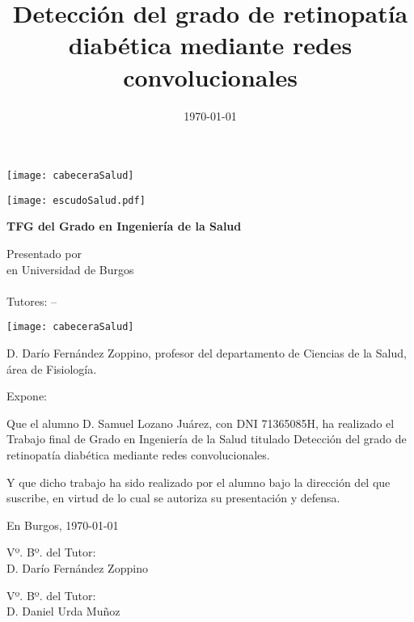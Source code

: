 \documentclass[a4paper,12pt,twoside]{memoir}
\title{Detección del grado de retinopatía diabética mediante redes convolucionales}
\author{\nombre}
\date{\today}
\makeatletter
\def\maketitle{
  \null
  \thispagestyle{empty}
\begin{center}
  \noindent\texttt{[image: cabeceraSalud]}\vspace{1.5cm}%
\end{center}
  
  \begin{center}
    \begin{minipage}[c][1.5cm][c]{.20\textwidth}
        \texttt{[image: escudoSalud.pdf]}
    \end{minipage}
  \end{center}
  
  \begin{center}
    \colorbox{cpardoBox}{%
        \begin{minipage}{.8\textwidth}
          \vspace{.5cm}\Large
          \begin{center}
          \textbf{TFG del Grado en Ingeniería de la Salud}\vspace{.6cm}\\
          \textbf{\LARGE\@title{}}
          \end{center}
          \vspace{.2cm}
        \end{minipage}
    }%
  \end{center}
  
  \begin{center}%
  {%
    \noindent\LARGE
    Presentado por \@author{}\\ 
    en Universidad de Burgos\\
    \vspace{0.5cm}
    \noindent\Large
    \@date{}\\
    \vspace{0.5cm}
    Tutores: \@tutor{} -- \@tutorb{}\\
  }%
  \end{center}%
  \null
  \cleardoublepage
  }
\newcommand{\nombre}{Samuel Lozano Juárez}
\newcommand{\nombreTutor}{Darío Fernández Zoppino}
\newcommand{\nombreTutorb}{Daniel Urda Muñoz}
\newcommand{\dni}{71365085H}
\makeatother
\begin{document}
\maketitle


\newpage\null\thispagestyle{empty}\newpage

\thispagestyle{empty}


\noindent\texttt{[image: cabeceraSalud]}\vspace{1cm}

\noindent D. \nombreTutor, profesor del departamento de Ciencias de la Salud, área de Fisiología.

\noindent Expone:

\noindent Que el alumno D. \nombre, con DNI \dni, ha realizado el Trabajo final de Grado en Ingeniería de la Salud titulado Detección del grado de retinopatía diabética mediante redes convolucionales. 

\noindent Y que dicho trabajo ha sido realizado por el alumno bajo la dirección del que suscribe, en virtud de lo cual se autoriza su presentación y defensa.

\begin{center} %
En Burgos, {\large \today}
\end{center}

\vfill\vfill\vfill

\begin{minipage}{0.45\textwidth}
\begin{flushleft} %
Vº. Bº. del Tutor:\\[2cm]
D. \nombreTutor
\end{flushleft}
\end{minipage}
\hfill
\begin{minipage}{0.45\textwidth}
\begin{flushleft} %
Vº. Bº. del Tutor:\\[2cm]
D. \nombreTutorb
\end{flushleft}
\end{minipage}
\hfill

\vfill



\newpage\null\thispagestyle{empty}\newpage
\end{document}
